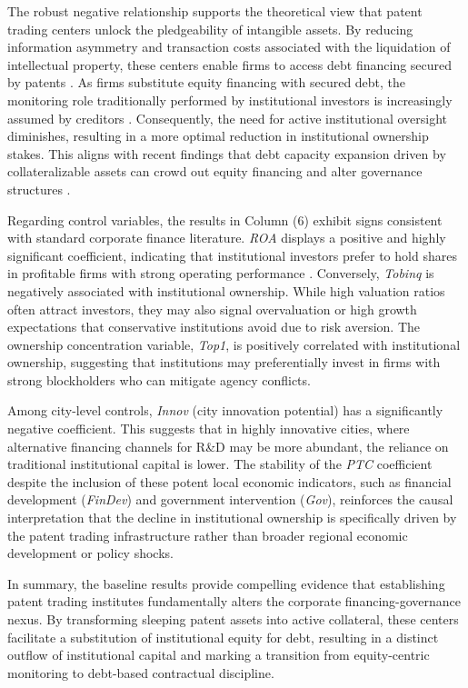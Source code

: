 \documentclass[12pt,a4paper]{article}
\begin{document}
The robust negative relationship supports the theoretical view that patent trading centers unlock the pledgeability of intangible assets. By reducing information asymmetry and transaction costs associated with the liquidation of intellectual property, these centers enable firms to access debt financing secured by patents \citep{mann2018creditor}. As firms substitute equity financing with secured debt, the monitoring role traditionally performed by institutional investors is increasingly assumed by creditors \citep{hochberg2018patent}. Consequently, the need for active institutional oversight diminishes, resulting in a more optimal reduction in institutional ownership stakes. This aligns with recent findings that debt capacity expansion driven by collateralizable assets can crowd out equity financing and alter governance structures \citep{falato2022rising}.

Regarding control variables, the results in Column (6) exhibit signs consistent with standard corporate finance literature. \textit{ROA} displays a positive and highly significant coefficient, indicating that institutional investors prefer to hold shares in profitable firms with strong operating performance \citep{mccahery2016behind}. Conversely, \textit{Tobinq} is negatively associated with institutional ownership. While high valuation ratios often attract investors, they may also signal overvaluation or high growth expectations that conservative institutions avoid due to risk aversion. The ownership concentration variable, \textit{Top1}, is positively correlated with institutional ownership, suggesting that institutions may preferentially invest in firms with strong blockholders who can mitigate agency conflicts.

Among city-level controls, \textit{Innov} (city innovation potential) has a significantly negative coefficient. This suggests that in highly innovative cities, where alternative financing channels for R\&D may be more abundant, the reliance on traditional institutional capital is lower. The stability of the \textit{PTC} coefficient despite the inclusion of these potent local economic indicators, such as financial development (\textit{FinDev}) and government intervention (\textit{Gov}), reinforces the causal interpretation that the decline in institutional ownership is specifically driven by the patent trading infrastructure rather than broader regional economic development or policy shocks.

In summary, the baseline results provide compelling evidence that establishing patent trading institutes fundamentally alters the corporate financing-governance nexus. By transforming sleeping patent assets into active collateral, these centers facilitate a substitution of institutional equity for debt, resulting in a distinct outflow of institutional capital and marking a transition from equity-centric monitoring to debt-based contractual discipline. 
\end{document}
